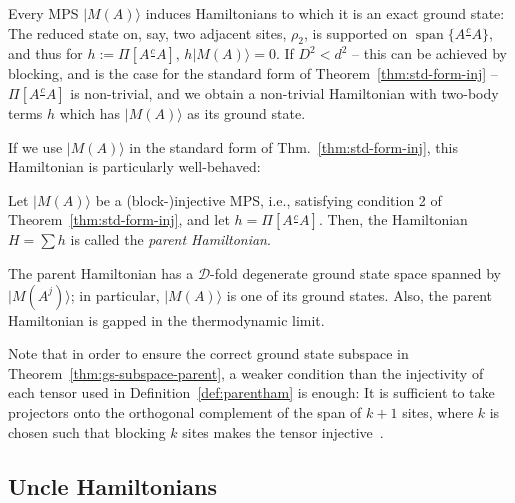 \documentclass[cmp]{svjour}
\newcommand{\mc}[1]{\mathcal{#1}}
\DeclareMathOperator{\spann}{span}
\newcommand{\ket}[1]{|#1\rangle}
\def\cont{\tfrac{c}{\ \ }}
\begin{document}
Every MPS $\ket{M(A)}$ induces Hamiltonians to which it is an exact ground
state: The reduced state on, say, two adjacent sites, $\rho_2$, is
supported on $\spann\{A\cont A\}$, and thus for $h:=\Pi[A\cont
        A]$, $h\ket{M(A)}=0$.
If $D^2<d^2$ -- this can be achieved by blocking, and is the case for the
standard form of Theorem~\ref{thm:std-form-inj} -- $\Pi[A\cont A]$ is
non-trivial, and we obtain a non-trivial Hamiltonian with two-body terms
$h$ which has $\ket{M(A)}$ as its ground state.

If we use $\ket{M(A)}$ in the standard form of
Thm.~\ref{thm:std-form-inj}, this Hamiltonian is particularly
well-behaved:
\begin{definition}
    \label{def:parentham}
    Let $\ket{M(A)}$ be a \mbox{(block-)}injective MPS, i.e., satisfying
    condition 2 of Theorem~\ref{thm:std-form-inj}, and let $h=\Pi[A\cont A]$.
    Then, the Hamiltonian $H=\sum h$ is called the \emph{parent
        Hamiltonian}.
\end{definition}

\begin{theorem}
    \label{thm:gs-subspace-parent}
    The parent Hamiltonian has a $\mc D$-fold degenerate ground state space
    spanned by $\ket{M(A^j)}$; in particular, $\ket{M(A)}$ is one of its
    ground states. Also, the parent Hamiltonian is gapped in the thermodynamic
    limit.
\end{theorem}
%
\begin{remark}\label{remark:parent-ham-weaker-cond}
    Note that in order to ensure the correct ground state subspace in
    Theorem~\ref{thm:gs-subspace-parent}, a weaker condition than the
    injectivity of each tensor used in Definition~\ref{def:parentham} is
    enough: It is sufficient to take projectors onto the orthogonal
    complement of the span of $k+1$ sites, where $k$ is chosen such that
    blocking $k$ sites makes the tensor injective~\cite{sanz:wielandt}.
\end{remark}



\subsection{Uncle Hamiltonians}
\end{document}
